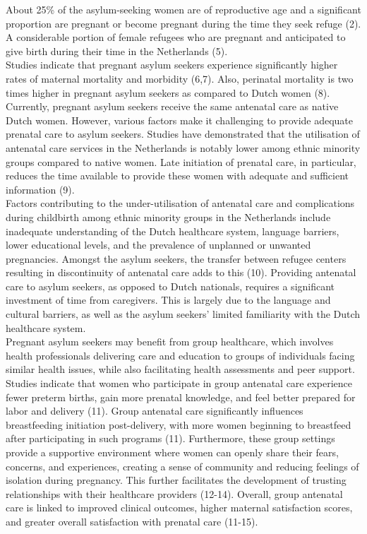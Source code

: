 \documentclass[12pt]{article}
\begin{document}
\noindent About 25\% of the asylum-seeking women are of reproductive age and a significant proportion are pregnant or become pregnant during the time they seek refuge (2). A considerable portion of female refugees who are pregnant and anticipated to give birth during their time in the Netherlands (5). \\

\noindent Studies indicate that pregnant asylum seekers experience significantly higher rates of maternal mortality and morbidity (6,7). Also, perinatal mortality is two times higher in pregnant asylum seekers as compared to Dutch women (8). Currently, pregnant asylum seekers receive the same antenatal care as native Dutch women. However, various factors make it challenging to provide adequate prenatal care to asylum seekers. Studies have demonstrated that the utilisation of antenatal care services in the Netherlands is notably lower among ethnic minority groups compared to native women. Late initiation of prenatal care, in particular, reduces the time available to provide these women with adequate and sufficient information (9). \\

\noindent Factors contributing to the under-utilisation of antenatal care and complications during childbirth among ethnic minority groups in the Netherlands include inadequate understanding of the Dutch healthcare system, language barriers, lower educational levels, and the prevalence of unplanned or unwanted pregnancies. Amongst the asylum seekers, the transfer between refugee centers resulting in discontinuity of antenatal care adds to this (10). Providing antenatal care to asylum seekers, as opposed to Dutch nationals, requires a significant investment of time from caregivers. This is largely due to the language and cultural barriers, as well as the asylum seekers' limited familiarity with the Dutch healthcare system. \\

\noindent Pregnant asylum seekers may benefit from group healthcare, which involves health professionals delivering care and education to groups of individuals facing similar health issues, while also facilitating health assessments and peer support. Studies indicate that women who participate in group antenatal care experience fewer preterm births, gain more prenatal knowledge, and feel better prepared for labor and delivery (11). Group antenatal care significantly influences breastfeeding initiation post-delivery, with more women beginning to breastfeed after participating in such programs (11). Furthermore, these group settings provide a supportive environment where women can openly share their fears, concerns, and experiences, creating a sense of community and reducing feelings of isolation during pregnancy. This further facilitates the development of trusting relationships with their healthcare providers (12-14). Overall, group antenatal care is linked to improved clinical outcomes, higher maternal satisfaction scores, and greater overall satisfaction with prenatal care (11-15). \\
\end{document}
